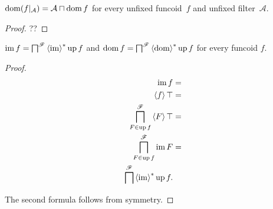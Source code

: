 \begin{cor}
$\dom(f|_{\mathcal{A}})=\mathcal{A}\sqcap\dom f$ for every unfixed funcoid~$f$
and unfixed filter~$\mathcal{A}$.
\end{cor}

\begin{proof}
??
\end{proof}

\begin{thm}
$\im f=\bigsqcap^{\mathscr{F}}\rsupfun{\im}\up f$ and $\dom
f=\bigsqcap^{\mathscr{F}}\rsupfun{\dom}\up f$
for every funcoid $f$.\end{thm}
\begin{proof}
~
\begin{align*}
\im f & =\\
\supfun f\top & =\\
\bigsqcap_{F\in\up f}^{\mathscr{F}}\supfun F\top & =\\
\bigsqcap_{F\in\up f}^{\mathscr{F}}\im F & =\\
\bigsqcap^{\mathscr{F}}\rsupfun{\im}\up f.
\end{align*}


The second formula follows from symmetry.\end{proof}

